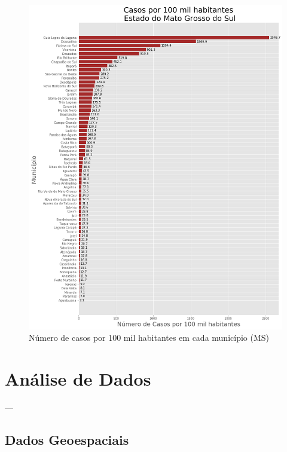 \documentclass[12pt]{article}
\begin{document}
\begin{figure}[!htb]
  \centering
  \includegraphics[width=1\textwidth]{figs/casos_100_mil_por_municipio.png}
  \caption{Número de casos por 100 mil habitantes em cada município (MS)}
  \label{fig:casosMuni100k}
  \end{figure}

\section{Análise de Dados}\label{sec:dados}

---

\subsection{Dados Geoespaciais}\label{ssec:geo}
\end{document}

